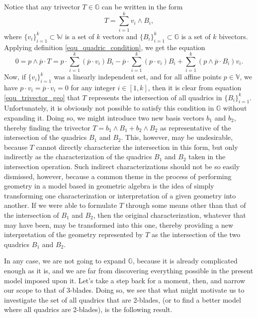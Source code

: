 \documentclass{birkjour}
\theoremstyle{definition}
\theoremstyle{remark}
\numberwithin{equation}{section}
\newcommand{\G}{\mathbb{G}}
\newcommand{\V}{\mathbb{V}}
\newcommand{\W}{\mathbb{W}}
\begin{document}
Notice that any trivector $T\in\G$ can be written in the form
\begin{equation}
T = \sum_{i=1}^k v_i\wedge B_i,
\end{equation}
where $\{v_i\}_{i=1}^k\subset\W$ is a set of $k$ vectors and $\{B_i\}_{i=1}^k\subset\G$
is a set of $k$ bivectors.  Applying definition \eqref{equ_quadric_condition}, we get the equation
\begin{equation}\label{equ_trivector_geo}
0 = p\wedge\overline{p}\cdot T =
p\cdot\sum_{i=1}^k(\overline{p}\cdot v_i)B_i -
\overline{p}\cdot\sum_{i=1}^k(p\cdot v_i)B_i +
\sum_{i=1}^k(p\wedge\overline{p}\cdot B_i)v_i.
\end{equation}
Now, if $\{v_i\}_{i=1}^k$ was a linearly independent set, and for all affine points $p\in\V$, we have $p\cdot v_i=\overline{p}\cdot v_i=0$
for any integer $i\in[1,k]$, then it is clear
from equation \eqref{equ_trivector_geo} that $T$ represents the intersection of all quadrics in $\{B_i\}_{i=1}^k$.
Unfortunately, it is obviously not possible to satisfy this condition in $\G$ without expanding it.
Doing so, we might introduce two new basis vectors $b_1$ and $b_2$, thereby finding the trivector
$T=b_1\wedge B_1+b_2\wedge B_2$ as representative of the intersection of the quadrics $B_1$ and $B_2$.
This, however, may be undesirable, because $T$ cannot directly characterize the intersection in this form, but
only indirectly as the characterization of the quadrics $B_1$ and $B_2$ taken in the intersection operation.
Such indirect characterizations should not be so easily dismissed, however, because a common theme
in the process of performing geometry in a model based in geometric algebra is the idea of simply transforming
one characterization or interpretation of a given geometry into another.  If we were able to formulate $T$ through some means
other than that of the intersection of $B_1$ and $B_2$, then the original characterization, whatever that may
have been, may be transformed into
this one, thereby providing a new interpretation of the geometry represented by $T$ as the intersection
of the two quadrics $B_1$ and $B_2$.

In any case, we are not going to expand $\G$, because it is already complicated enough as it is, and we
are far from discovering everything possible in the present model imposed upon it.
Let's take a step back for a moment, then, and narrow our scope to that of 3-blades.
Doing so, we see that
what might motivate us to investigate the set of all quadrics that are 2-blades, (or to find
a better model where all quadrics are 2-blades), is the following result.
\end{document}
